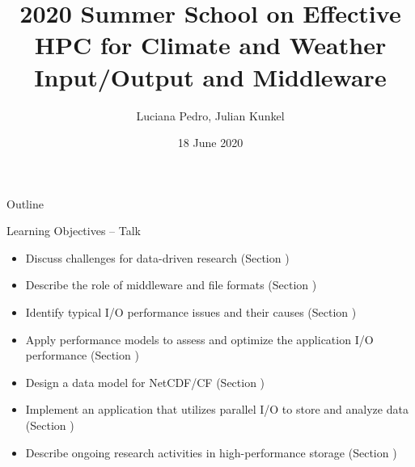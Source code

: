 \documentclass[compress,11pt,xcolor=svgnames,aspectratio=169]{beamer}
\title[Input/Output and Middleware -- Talk Session]{2020 Summer School on Effective HPC for Climate and Weather \\[0.5cm] Input/Output and Middleware}
\author[Pedro, Kunkel]{Luciana Pedro, Julian Kunkel
}
\institute[WP4 Team]{Department of Computer Science, University of Reading}
\date{18 June 2020}
\begin{document}
\begin{frame}[plain]
    \titlepage
\end{frame}

\begin{withoutheadline}
\begin{frame}{Outline}
    \begin{centering}
    {\tiny
    \tableofcontents[hideallsubsections]
    }
    \end{centering}
    \disclaimer
\end{frame}
\end{withoutheadline}


\begin{frame}[fragile]{Learning Objectives -- Talk}

{\footnotesize

\begin{itemize}
\setlength\itemsep{0.4cm}
  \item Discuss challenges for data-driven research (Section )
  \item Describe the role of middleware and file formats (Section )
  \item Identify typical I/O performance issues and their causes (Section )
  \item Apply performance models to assess and optimize the application I/O performance (Section )
  \item Design a data model for NetCDF/CF (Section )
  \item Implement an application that utilizes parallel I/O to store and analyze data (Section )
  \item Describe ongoing research activities in high-performance storage (Section )
\end{itemize}

}

\end{frame}
\end{document}
